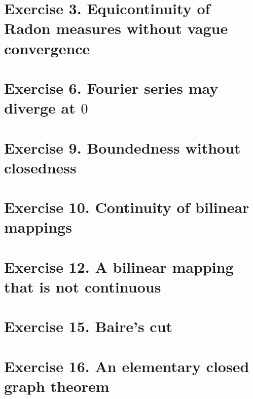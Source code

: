 %
\setcounter{section}{2}
%
\section{Exercise 3. Equicontinuity of Radon measures without vague convergence}\label{2.3}
 
% 
\setcounter{section}{5}
%
\section{Exercise 6. Fourier series may diverge at \texorpdfstring{$0$}{0}} 
 
% 
\setcounter{section}{8}
%
\section{Exercise 9. Boundedness without closedness}\label{2.9}
 
% 
\section{Exercise 10. Continuity of bilinear mappings}
 
% 
\setcounter{section}{11}
%
\section{Exercise 12. A bilinear mapping that is not continuous} 
 
% 
\setcounter{section}{14}
%
\section{Exercise 15. Baire's cut} 
 
% 
\section{Exercise 16. An elementary closed graph theorem} 
 
%
% 